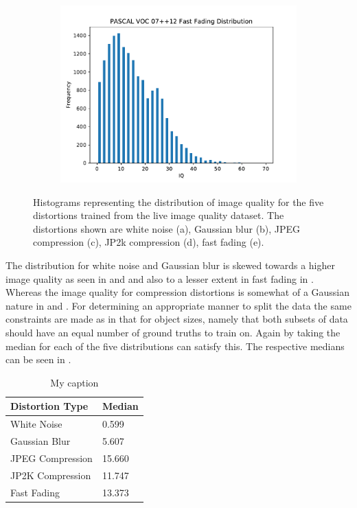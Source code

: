 \begin{figure}[H]
\begin{subfigure}[b]{0.4\textwidth}
        \includegraphics[width=\textwidth]{Figs/Implementation/FastFadingdist.pdf}
        \caption{}\label{fig:dist_ff}
    \end{subfigure}
    \caption{Histograms representing the distribution of image quality for the five distortions trained from the \gls{live} image quality dataset. The distortions shown are white noise (a), Gaussian blur (b), JPEG compression (c), JP2k compression (d), fast fading (e).}
    \label{fig:iqdist}
\end{figure} 

The distribution for white noise and Gaussian blur is skewed towards a higher image quality as seen in  and  and also to a lesser extent in fast fading in . Whereas the image quality for compression distortions is somewhat of a Gaussian nature in  and . For determining an appropriate manner to split the data the same constraints are made as in that for object sizes, namely that both subsets of data should have an equal number of ground truths to train on. Again by taking the median for each of the five distributions can satisfy this. The respective medians can be seen in .

\begin{table}[h]
\centering
\caption{My caption}
\label{tab:iq_splits}
\begin{tabular}{|l|l|}
\hline
\textbf{Distortion Type}   & \textbf{Median} \\ \hline
White Noise       & 0.599  \\ \hline
Gaussian Blur     & 5.607  \\ \hline
JPEG Compression  & 15.660 \\ \hline
JP2K Compression & 11.747 \\ \hline
Fast Fading       & 13.373 \\ \hline
\end{tabular}
\end{table}

